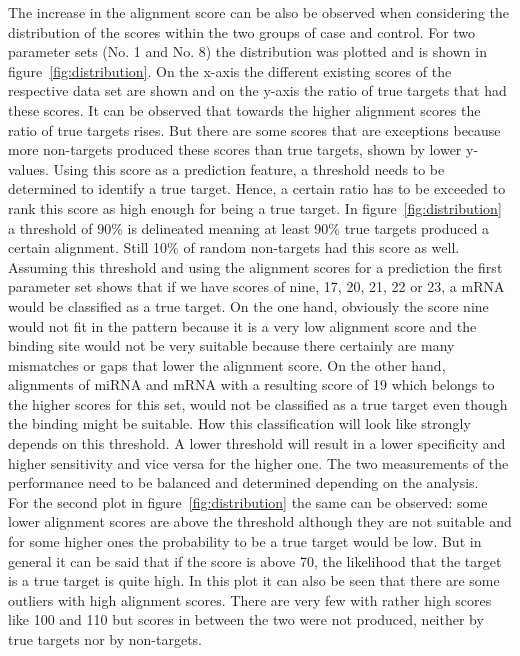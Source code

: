 \documentclass[12pt,  a4paper]{report}
\begin{document}
The increase in the alignment score can be also be observed when considering the distribution of the scores within the two groups of case and control. For two parameter sets (No. 1 and No. 8) the distribution was plotted and is shown in figure~\ref{fig:distribution}. On the x-axis the different existing scores of the respective data set are shown and on the y-axis the ratio of true targets that had these scores. It can be observed that towards the higher alignment scores the ratio of true targets rises. But there are some scores that are exceptions because more non-targets produced these scores than true targets, shown by lower y-values. Using this score as a prediction feature, a threshold needs to be determined to identify a true target. Hence, a certain ratio has to be exceeded to rank this score as high enough for being a true target. In figure~\ref{fig:distribution} a threshold of 90\% is delineated meaning at least 90\% true targets produced a certain alignment. Still 10\% of random non-targets had this score as well. Assuming this threshold and using the alignment scores for a prediction the first parameter set shows that if we have scores of nine, 17, 20, 21, 22 or 23, a mRNA would be classified as a true target. On the one hand, obviously the score nine would not fit in the pattern because it is a very low alignment score and the binding site would not be very suitable because there certainly are many mismatches or gaps that lower the alignment score. On the other hand, alignments of miRNA and mRNA with a resulting score of 19 which belongs to the higher scores for this set, would not be classified as a true target even though the binding might be suitable. How this classification will look like strongly depends on this threshold. A lower threshold will result in a lower specificity and higher sensitivity and vice versa for the higher one. The two measurements of the performance need to be balanced and determined depending on the analysis. \\

For the second plot in figure~\ref{fig:distribution} the same can be observed: some lower alignment scores are above the threshold although they are not suitable and for some higher ones the probability to be a true target would be low. But in general it can be said that if the score is above 70, the likelihood that the target is a true target is quite high. In this plot it can also be seen that there are some outliers with high alignment scores. There are very few with rather high scores like 100 and 110 but scores in between the two were not produced, neither by true targets nor by non-targets.  \\
\end{document}
